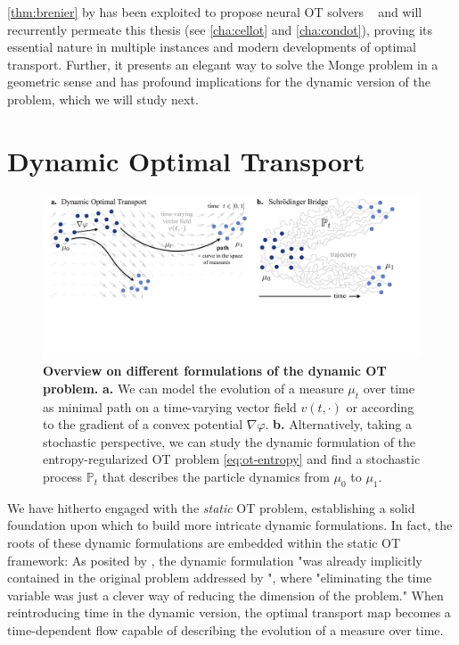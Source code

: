 \cref{thm:brenier} by \citet{brenier1987decomposition, brenier1991polar} has been exploited to propose neural OT solvers ~\citep{taghvaei20192, makkuva2020optimal, korotin2021wasserstein, bunne2022proximal, alvarez2021optimizing, mokrov2021large, amos2023amortizing} and  will recurrently permeate this thesis (see  \cref{cha:cellot} and \ref{cha:condot}), proving its essential nature in multiple instances and modern developments of optimal transport.
Further, it presents an elegant way to solve the Monge problem in a geometric sense and has profound implications for the dynamic version of the problem, which we will study next.


\section{Dynamic Optimal Transport} \label{sec:background_ot_dynamic}

\begin{figure}[t]
  \includegraphics[width=\textwidth]{figures/fig_dynamic_ot_background.pdf}
  \caption{ \textbf{Overview on different formulations of the dynamic OT problem.} \textbf{a.} We can model the evolution of a measure $\mu_t$ over time as minimal path on a time-varying vector field $v(t, \cdot)$ or according to the gradient of a convex potential $\nabla \varphi$. \textbf{b.} Alternatively, taking a stochastic perspective, we can study the dynamic formulation of the entropy-regularized \acrshort{OT} problem \eqref{eq:ot-entropy} and find a stochastic process $\mathbb{P}_t$ that describes the particle dynamics from $\mu_0$ to $\mu_1$.}	
  \label{fig:dynamic_ot_background}
\end{figure}

We have hitherto engaged with the \emph{static} \acrlong{OT} problem, establishing a solid foundation upon which to build more intricate dynamic formulations. In fact, the roots of these dynamic formulations are embedded within the static \acrshort{OT} framework: As posited by \citet{benamou2000computational}, the dynamic formulation "was already implicitly contained in the original problem addressed by \citeauthor{monge1781histoire}", where "eliminating the time variable was just a clever way of reducing the dimension of the problem." When reintroducing time in the dynamic version, the optimal transport map becomes a time-dependent flow capable of describing the evolution of a measure over time.

